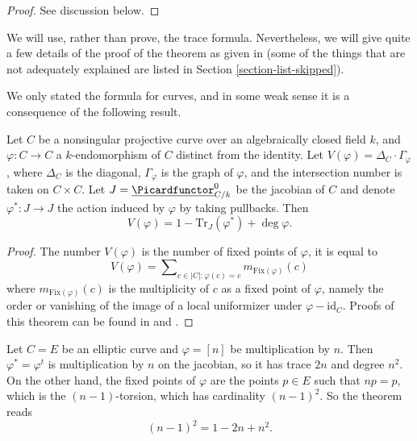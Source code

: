 \begin{proof}
See discussion below.
\end{proof}

\noindent
We will use, rather than prove, the trace formula. Nevertheless, we will
give quite a few details of the proof of the theorem as given in
\cite{SGA4.5} (some of the things that are not adequately explained
are listed in Section \ref{section-list-skipped}).

\medskip\noindent
We only stated the formula for curves, and in some weak
sense it is a consequence of the following result.

\begin{theorem}[Weil]
\label{theorem-weil-trace-formula}
Let $C$ be a nonsingular projective curve over an algebraically closed field
$k$, and $\varphi : C \to C$ a $k$-endomorphism of $C$ distinct from the
identity. Let $V(\varphi) = \Delta_C \cdot \Gamma_\varphi$, where $\Delta_C$ is
the diagonal, $\Gamma_\varphi$ is the graph of $\varphi$, and the intersection
number is taken on $C \times C$. Let $J = \underline{\Picardfunctor}^0_{C/k}$
be the jacobian of $C$ and denote $\varphi^* : J \to J$ the action induced by
$\varphi$ by taking pullbacks. Then
$$
V(\varphi) = 1 - \text{Tr}_J(\varphi^*) + \deg \varphi.
$$
\end{theorem}

\begin{proof}
The number $V(\varphi)$ is the number of fixed points of $\varphi$, it is equal
to
$$
V(\varphi) =
\sum\nolimits_{c \in |C| : \varphi(c) = c} m_{\text{Fix}(\varphi)} (c)
$$
where $m_{\text{Fix}(\varphi)} (c)$ is the multiplicity of $c$ as a fixed point
of $\varphi$, namely the order or vanishing of the image of a local uniformizer
under $\varphi - \text{id}_C$. Proofs of this theorem can be found in
\cite{Lang} and \cite{Weil}.
\end{proof}

\begin{example}
\label{example-elliptic-curve}
Let $C = E$ be an elliptic curve and $\varphi = [n]$ be multiplication by $n$.
Then $\varphi^* = \varphi^t$ is multiplication by $n$ on the jacobian, so it
has trace $2n$ and degree $n^2$. On the other hand, the fixed points of
$\varphi$ are the points $p \in E$ such that $n p = p$, which is the
$(n-1)$-torsion, which has cardinality $(n-1)^2$. So the theorem reads
$$
(n-1)^2 = 1 - 2n + n^2.
$$
\end{example}

